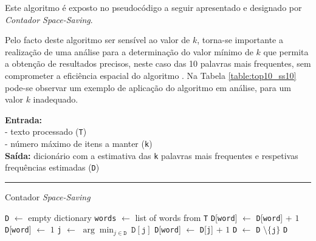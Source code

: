 \documentclass[mirror, portugues]{revdetua}
\begin{document}
Este algoritmo é exposto no pseudocódigo a seguir apresentado e designado por \textit{Contador Space-Saving}.

Pelo facto deste algoritmo ser sensível ao valor de $k$, torna-se importante a realização de uma análise para a determinação do valor mínimo de $k$ que permita a obtenção de resultados precisos, neste caso das 10 palavras mais frequentes, sem comprometer a eficiência espacial do algoritmo \cite{ZF22}. Na Tabela \ref{table:top10_ss10} pode-se observar um exemplo de aplicação do algoritmo em análise, para um valor $k$ inadequado.

\begin{algorithm}[H]
\raggedright
\textbf{Entrada:} \\
- texto processado (\texttt{T}) \\
- número máximo de itens a manter (\texttt{k}) \\
\textbf{Saída:} dicionário com a estimativa das \texttt{k} palavras mais frequentes e respetivas frequências estimadas (\texttt{D}) \\
\hrule 
\caption{Contador \textit{Space-Saving} \cite{CG09}}
\begin{algorithmic}[1]
    \State \texttt{D} $\gets$ empty dictionary
    \State \texttt{words} $\gets$ list of words from \texttt{T}
            \State \texttt{D}[\texttt{word}] $\gets$ \texttt{D}[\texttt{word}] + $1$
            \State \texttt{D}[\texttt{word}] $\gets$ $1$
        \Else
            \State \texttt{j} $\gets$ $\arg \min_{j \in \texttt{D}}\ \texttt{D}[\texttt{j}]$
            \State \texttt{D}[\texttt{word}] $\gets$ \texttt{D}[\texttt{j}] + $1$
            \State \texttt{D} $\gets$ \texttt{D} $\setminus \{\texttt{j}\}$
        \EndIf
    \EndFor
    \State \Return \texttt{D}
\end{algorithmic}
\end{algorithm}
\end{document}
